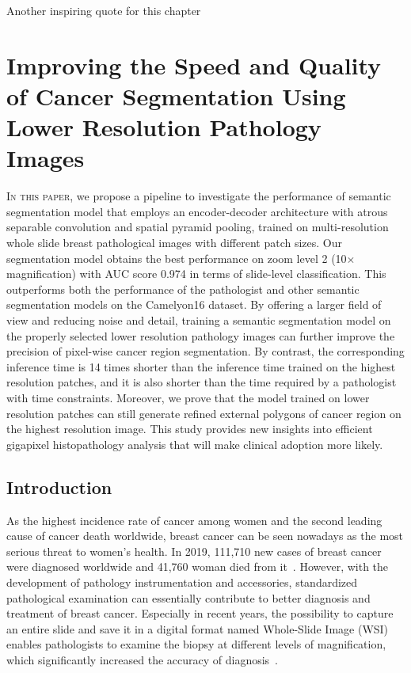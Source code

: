 
\begin{savequote}[75mm]
Another inspiring quote for this chapter
\end{savequote}


\chapter[Improving the Speed and Quality of Cancer Segmentation Using Lower Resolution Pathology Images]{Improving the Speed and Quality of Cancer Segmentation Using Lower Resolution Pathology Images}
 
\lettrine[lines=3]{\textcolor{SchoolColor}{I}}{n this paper},
we propose a pipeline to investigate the performance of semantic segmentation model that employs an encoder-decoder architecture with atrous separable convolution and spatial pyramid pooling, trained on multi-resolution whole slide breast pathological images with different patch sizes. Our segmentation model obtains the best performance on zoom level 2 (10$\times$magnification) with AUC score 0.974 in terms of slide-level classification. This outperforms both the performance of the pathologist and other semantic segmentation models on the Camelyon16 dataset. By offering a larger field of view and reducing noise and detail, training
a semantic segmentation model on the properly selected lower resolution pathology images can further improve the precision of pixel-wise cancer region segmentation. By contrast, the corresponding inference time is 14 times shorter than the inference time trained on the highest resolution patches, and it is also shorter than the time required by a pathologist with time constraints.
Moreover, we prove that the model trained on lower resolution patches can still generate refined external polygons of cancer region on the highest resolution image. This study provides new insights into efficient gigapixel histopathology analysis that will make clinical adoption more likely.

\section{Introduction}\label{se:3-1}

As the highest incidence rate of cancer among women and the second leading cause of cancer death worldwide, breast cancer can be seen nowadays as the most serious threat to women's health. In 2019, 111,710 new cases of breast cancer were diagnosed worldwide and 41,760 woman died from it~\cite{Siegel2019}. However, with the development of pathology instrumentation and accessories, standardized pathological examination  can essentially contribute to better diagnosis and treatment of breast cancer. Especially in recent years, the possibility to capture an entire slide and save it in a digital format named Whole-Slide Image (WSI) enables pathologists to examine the biopsy at different levels of magnification, which significantly increased the accuracy of diagnosis~\cite{Pantanowitz2010}.  

